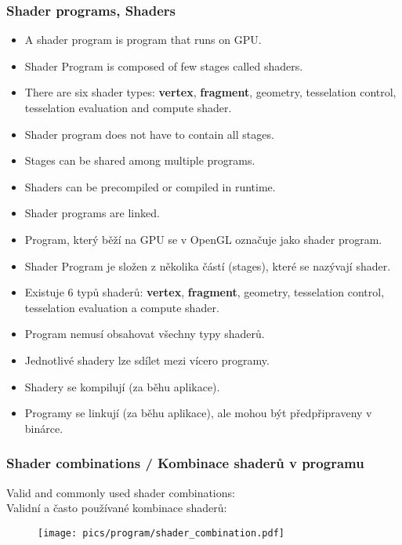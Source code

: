 \begin{frame}\frametitle{Shader programs, Shaders}
\scriptsize
\begin{itemize}
\item A shader program is program that runs on GPU.
\item Shader Program is composed of few stages called shaders.
\item There are six shader types: \textbf{vertex}, \textbf{fragment}, geometry, tesselation control, tesselation evaluation and compute shader.
\item Shader program does not have to contain all stages.
\item Stages can be shared among multiple programs.
\item Shaders can be precompiled or compiled in runtime.
\item Shader programs are linked.
\end{itemize}

\begin{itemize}
\item Program, který běží na GPU se v OpenGL označuje jako shader program.
\item Shader Program je složen z několika částí (stages), které se nazývají shader.
\item Existuje 6 typů shaderů: \textbf{vertex}, \textbf{fragment}, geometry, tesselation control, tesselation evaluation a compute shader.
\item Program nemusí obsahovat všechny typy shaderů.
\item Jednotlivé shadery lze sdílet mezi vícero programy.
\item Shadery se kompilují (za běhu aplikace).
\item Programy se linkují (za běhu aplikace), ale mohou být předpřipraveny v binárce.
\end{itemize}
\end{frame}

\begin{frame}\frametitle{Shader combinations / Kombinace shaderů v programu}
  Valid and commonly used shader combinations:\\
  Validní a často používané kombinace shaderů:
  \begin{figure}[h]
    \texttt{[image: pics/program/shader\_combination.pdf]}
  \end{figure}
\end{frame}

